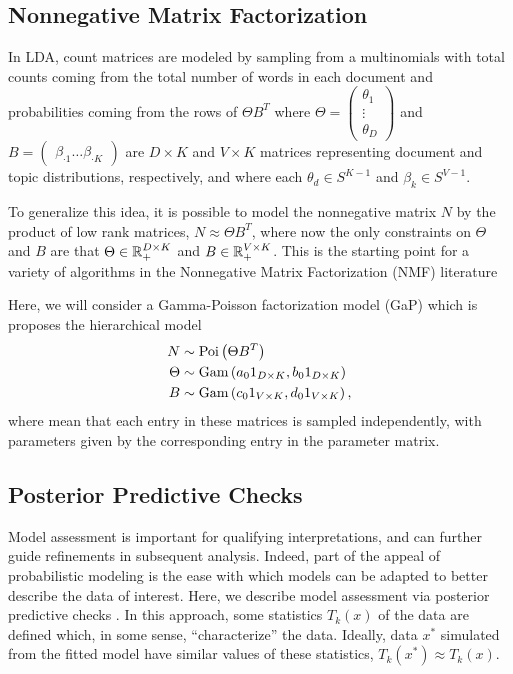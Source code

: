 \documentclass[oupdraft]{bio}
\begin{document}
\subsection{Nonnegative Matrix Factorization}
\label{sec:nmf}

In LDA, count matrices are modeled by sampling from a multinomials with total
counts coming from the total number of words in each document and probabilities
coming from the rows of $\Theta B^{T}$ where $\Theta = \begin{pmatrix}\theta_{1}
  \\ \vdots \\ \theta_{D} \end{pmatrix}$ and $B = \begin{pmatrix} \beta_{\cdot 1}
  \dots \beta_{\cdot K} \end{pmatrix}$ are $D \times K$ and $V \times K$ matrices
representing document and topic distributions, respectively, and where each
$\theta_{d} \in S^{K - 1}$ and $\beta_{k} \in S^{V - 1}$.


To generalize this idea, it is possible to model the nonnegative matrix $N$
by the product of low rank matrices, $N \approx \Theta B^{T}$, where now the
only constraints on $\Theta$ and $B$ are that $\Theta \in \mathbb{R}_{+}^{D \times
  K}$ and $B \in \mathbb{R}_{+}^{V \times K}$. This is the starting point for a
variety of algorithms in the Nonnegative Matrix Factorization (NMF) literature
\citep{wang2013nonnegative, berry2007algorithms, lee2001algorithms}

Here, we will consider a Gamma-Poisson factorization model (GaP)
\citep{kucukelbir2015automatic, canny2004gap} which is proposes the hierarchical
model
\begin{align*}
N &\sim \textnormal{Poi}\left(\Theta B^{T}\right) \\
\Theta &\sim \textnormal{Gam}\left(a_{0} 1_{D \times K}, b_{0} 1_{D \times K}\right) \\
B &\sim \textnormal{Gam}\left(c_{0} 1_{V \times K}, d_{0} 1_{V \times K} \right),
\end{align*}
where mean that each entry in these matrices is sampled independently, with
parameters given by the corresponding entry in the parameter matrix.

\subsection{Posterior Predictive Checks}

Model assessment is important for qualifying interpretations, and can further
guide refinements in subsequent analysis. Indeed, part of the appeal of
probabilistic modeling is the ease with which models can be adapted to better
describe the data of interest. Here, we describe model assessment via posterior
predictive checks \citep{rubin1984bayesianly, gelman2013philosophy}. In this
approach, some statistics $T_{k}\left(x\right)$ of the data are defined which,
in some sense, ``characterize'' the data. Ideally, data $x^{\ast}$ simulated
from the fitted model have similar values of these statistics,
$T_{k}\left(x^{\ast}\right) \approx T_{k}\left(x\right)$.
\end{document}
